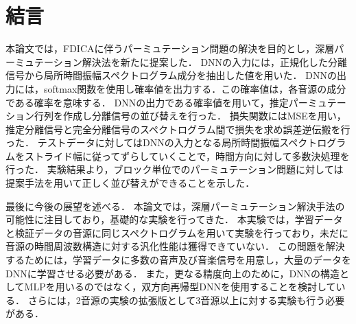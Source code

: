 \chapter{結言}
\label{chap:con}

本論文では，FDICAに伴うパーミュテーション問題の解決を目的とし，深層パーミュテーション解決法を新たに提案した．
DNNの入力には，正規化した分離信号から局所時間振幅スペクトログラム成分を抽出した値を用いた．
DNNの出力には，softmax関数を使用し確率値を出力する．この確率値は，各音源の成分である確率を意味する．
DNNの出力である確率値を用いて，推定パーミュテーション行列を作成し分離信号の並び替えを行った．
損失関数にはMSEを用い，推定分離信号と完全分離信号のスペクトログラム間で損失を求め誤差逆伝搬を行った．
テストデータに対してはDNNの入力となる局所時間振幅スペクトログラムをストライド幅に従ってずらしていくことで，時間方向に対して多数決処理を行った．
実験結果より，ブロック単位でのパーミュテーション問題に対しては提案手法を用いて正しく並び替えができることを示した．

最後に今後の展望を述べる．
本論文では，深層パーミュテーション解決手法の可能性に注目しており，基礎的な実験を行ってきた．
本実験では，学習データと検証データの音源に同じスペクトログラムを用いて実験を行っており，未だに音源の時間周波数構造に対する汎化性能は獲得できていない．
この問題を解決するためには，学習データに多数の音声及び音楽信号を用意し，大量のデータをDNNに学習させる必要がある．
また，更なる精度向上のために，DNNの構造としてMLPを用いるのではなく，双方向再帰型DNNを使用することを検討している．
さらには，2音源の実験の拡張版として3音源以上に対する実験も行う必要がある．

